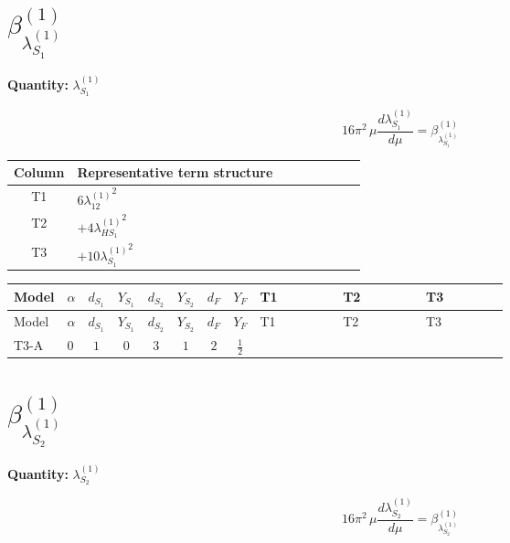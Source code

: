 \documentclass[8pt]{article}
\begin{document}
\begin{landscape}
\section*{$\beta_{\lambda_{S_1}^{(1)}}^{(1)}$}
\noindent\textbf{Quantity: }$\lambda_{S_1}^{(1)}$\par\smallskip
\[16\pi^2\,\mu\frac{d \lambda_{S_1}^{(1)}}{d\mu}=\beta_{\lambda_{S_1}^{(1)}}^{(1)}\]
\begin{center}
\begin{tabular}{@{}c >{\raggedright\arraybackslash}p{0.82\linewidth}@{}}
\toprule
Column & Representative term structure \\
\midrule
T1 & \(\displaystyle 6 {\lambda_{12}^{(1)}}^2\) \\
\midrule
T2 & \(\displaystyle +4 {\lambda_{HS_1}^{(1)}}^2\) \\
\midrule
T3 & \(\displaystyle +10 {\lambda_{S_1}^{(1)}}^2\) \\
\midrule
\bottomrule
\end{tabular}
\end{center}
\smallskip
\tiny
\begin{longtable}{@{}llcccccc >{\raggedright\arraybackslash}p{0.21\linewidth} >{\raggedright\arraybackslash}p{0.21\linewidth} >{\raggedright\arraybackslash}p{0.21\linewidth}@{}}
\toprule
Model & $\alpha$ & $d_{S_1}$ & $Y_{S_1}$ & $d_{S_2}$ & $Y_{S_2}$ & $d_F$ & $Y_F$ & T1 & T2 & T3 \\
\midrule
\endfirsthead
\toprule
Model & $\alpha$ & $d_{S_1}$ & $Y_{S_1}$ & $d_{S_2}$ & $Y_{S_2}$ & $d_F$ & $Y_F$ & T1 & T2 & T3 \\
\midrule
\endhead
T3-A & $0$ & $1$ & $0$ & $3$ & $1$ & $2$ & $\frac{1}{2}$ & \scriptsize\adjustbox{max width=\linewidth}{$\begin{gathered} 6 {\lambda_{12}^{(1)}}^2\end{gathered}$} & \scriptsize\adjustbox{max width=\linewidth}{$\begin{gathered} +4 {\lambda_{HS_1}^{(1)}}^2\end{gathered}$} & \scriptsize\adjustbox{max width=\linewidth}{$\begin{gathered} +10 {\lambda_{S_1}^{(1)}}^2\end{gathered}$} \\
\midrule
\bottomrule
\end{longtable}
\clearpage
\section*{$\beta_{\lambda_{S_2}^{(1)}}^{(1)}$}
\noindent\textbf{Quantity: }$\lambda_{S_2}^{(1)}$\par\smallskip
\[16\pi^2\,\mu\frac{d \lambda_{S_2}^{(1)}}{d\mu}=\beta_{\lambda_{S_2}^{(1)}}^{(1)}\]

\end{landscape}
\end{document}
